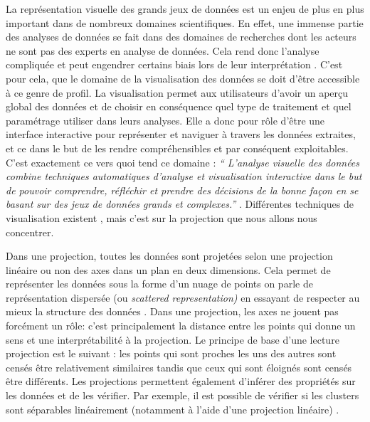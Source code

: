 
La représentation visuelle des grands jeux de données est un enjeu de plus en plus important dans de nombreux domaines scientifiques. En effet, une immense partie des analyses de données se fait dans des domaines de recherches dont les acteurs ne sont pas des experts en analyse de données. Cela rend donc l’analyse compliquée et peut engendrer certains biais lors de leur interprétation \cite{HeulotAnEvaluation}. C’est pour cela, que le domaine de la visualisation des données se doit d’être accessible à ce genre de profil.\newline
La visualisation permet aux utilisateurs d’avoir un aperçu global des données et de choisir en conséquence quel type de traitement et quel paramétrage utiliser dans leurs analyses. Elle a donc pour rôle d’être une interface interactive pour représenter et naviguer à travers les données extraites, et ce dans le but de les rendre compréhensibles et par conséquent exploitables\cite{card1999readings}. C’est exactement ce vers quoi tend ce domaine : \textit{“ L'analyse visuelle des données combine techniques automatiques d'analyse et visualisation interactive dans le but de pouvoir comprendre, réfléchir et prendre des décisions de la bonne façon en se basant sur des jeux de données grands et complexes.”} \cite{keim2008visual}. 
Différentes techniques de visualisation existent \cite{HeulotThese}, mais c’est sur la projection que nous allons nous concentrer. 
\smallskip

    Dans une projection, toutes les données sont projetées selon une projection linéaire ou non des axes dans un plan en deux dimensions. Cela permet de représenter les données sous la forme d’un nuage de points on parle de représentation dispersée (ou \textit{scattered representation)} en essayant de respecter au mieux la structure des données \cite{HeulotThese}. \newline 
    Dans une projection, les axes ne jouent pas forcément un rôle: c’est principalement la distance entre les points qui donne un sens et une interprétabilité à la projection\cite{koffka1997PsychoGesttalt}. 
    Le principe de base d'une lecture projection est le suivant : les points qui sont proches les uns des autres sont censés être relativement similaires tandis que ceux qui sont éloignés sont censés être différents. \newline 
    Les projections permettent également d’inférer des propriétés sur les données et de les vérifier. Par exemple, il est possible de vérifier si les clusters sont séparables linéairement (notamment à l’aide d’une projection linéaire) \cite{HeulotThese} .
\smallskip

